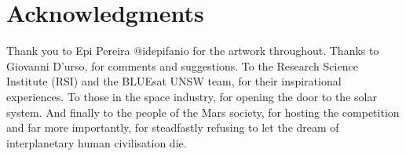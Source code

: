 \documentclass[fleqn,10pt]{Stylesheet} %
\begin{document}
\section*{Acknowledgments} %
Thank you to Epi Pereira @id\textunderscore epifanio for the artwork throughout. Thanks to Giovanni D'urso, for comments and suggestions. To the Research Science Institute (RSI) and the BLUEsat UNSW team, for their inspirational experiences. To those in the space industry, for opening the door to the solar system. And finally to the people of the Mars society,  for hosting the competition and far more importantly, for steadfastly refusing to let the dream of interplanetary human civilisation die.




\end{document}
